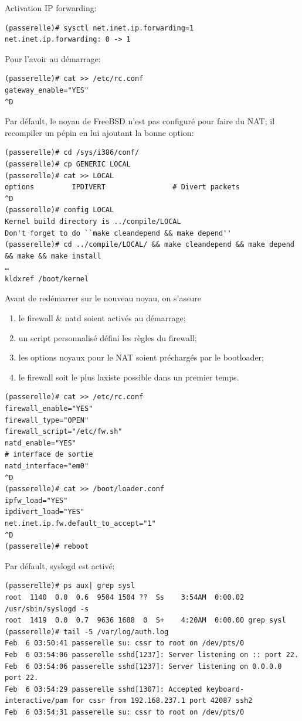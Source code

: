 \documentclass[a4paper]{article}
\begin{document}
Activation IP forwarding:
\begin{verbatim}
(passerelle)# sysctl net.inet.ip.forwarding=1
net.inet.ip.forwarding: 0 -> 1
\end{verbatim}

Pour l'avoir au démarrage:
\begin{verbatim}
(passerelle)# cat >> /etc/rc.conf
gateway_enable="YES"
^D
\end{verbatim}

Par défault, le noyau de FreeBSD n'est pas configuré pour
faire du NAT; il recompiler un pépin en lui ajoutant la
bonne option:
\begin{verbatim}
(passerelle)# cd /sys/i386/conf/
(passerelle)# cp GENERIC LOCAL
(passerelle)# cat >> LOCAL
options         IPDIVERT                # Divert packets
^D
(passerelle)# config LOCAL
Kernel build directory is ../compile/LOCAL
Don't forget to do ``make cleandepend && make depend''
(passerelle)# cd ../compile/LOCAL/ && make cleandepend && make depend && make && make install
…
kldxref /boot/kernel
\end{verbatim}

Avant de redémarrer sur le nouveau noyau, on s'assure
\begin{enumerate}
	\item le firewall \& natd soient activés au démarrage;
	\item un script personnalisé défini les règles du firewall;
	\item les options noyaux pour le NAT soient préchargés par le bootloader;
	\item le firewall soit le plus laxiste possible dans un premier temps.
\end{enumerate}
\begin{verbatim}
(passerelle)# cat >> /etc/rc.conf
firewall_enable="YES"
firewall_type="OPEN"
firewall_script="/etc/fw.sh"
natd_enable="YES"
# interface de sortie
natd_interface="em0"
^D
(passerelle)# cat >> /boot/loader.conf
ipfw_load="YES"
ipdivert_load="YES"
net.inet.ip.fw.default_to_accept="1"
^D
(passerelle)# reboot
\end{verbatim}

Par défault, syslogd est activé:
\begin{verbatim}
(passerelle)# ps aux| grep sysl
root  1140  0.0  0.6  9504 1504 ??  Ss    3:54AM  0:00.02 /usr/sbin/syslogd -s
root  1419  0.0  0.7  9636 1688  0  S+    4:20AM  0:00.00 grep sysl
(passerelle)# tail -5 /var/log/auth.log
Feb  6 03:50:41 passerelle su: cssr to root on /dev/pts/0
Feb  6 03:54:06 passerelle sshd[1237]: Server listening on :: port 22.
Feb  6 03:54:06 passerelle sshd[1237]: Server listening on 0.0.0.0 port 22.
Feb  6 03:54:29 passerelle sshd[1307]: Accepted keyboard-interactive/pam for cssr from 192.168.237.1 port 42087 ssh2
Feb  6 03:54:31 passerelle su: cssr to root on /dev/pts/0
\end{verbatim}
\end{document}
